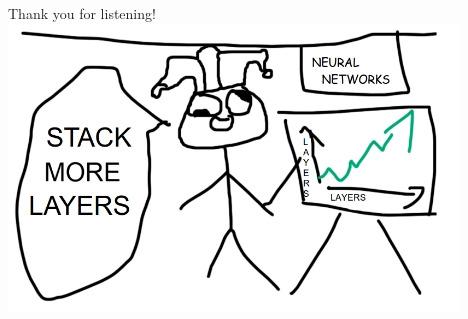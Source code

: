 \documentclass{beamer}
\begin{document}
\begin{frame}{Thank you for listening!}
    \includegraphics[width=\textwidth]{stackmorelayers.jpg}
\end{frame}
\end{document}
